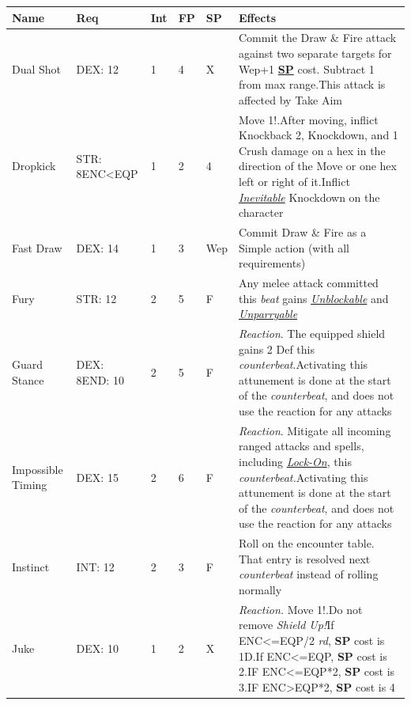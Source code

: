 \documentclass[12pt]{article}
\newcommand{\refto}[1]{\hyperlink{#1}{\textbf{#1}}}
\newcommand{\reftoit}[1]{\hyperlink{#1}{\emph{#1}}}
\begin{document}
\begin{center}
\begin{tabularx}{\textwidth}{p{}p{}p{}p{}p{}p{}}
\hline
\rowcolor{white} \textbf{Name} & \textbf{Req} & \textbf{Int} & \textbf{FP} & \textbf{SP} & \textbf{Effects}\setcounter{rownum}{0}\\
\hline
Dual Shot & DEX: 12 & 1 & 4 & X & Commit the Draw \& Fire attack against two separate targets for Wep+1 \refto{SP} cost. Subtract 1 from max range.\newline This attack is affected by Take Aim\\
Dropkick & STR: 8\newline ENC<EQP & 1 & 2 & 4 & Move 1!.\newline After moving, inflict Knockback 2, Knockdown, and 1 Crush damage on a hex in the direction of the Move or one hex left or right of it.\newline Inflict \reftoit{Inevitable} Knockdown on the character\\
Fast Draw & DEX: 14 & 1 & 3 & Wep & Commit Draw \& Fire as a Simple action (with all requirements)\\
Fury & STR: 12 & 2 & 5 & F & Any melee attack committed this \emph{beat} gains \reftoit{Unblockable} and \reftoit{Unparryable}\\
Guard Stance & DEX: 8\newline END: 10 & 2 & 5 & F & \emph{Reaction}. The equipped shield gains 2 Def this \emph{counterbeat}.\newline Activating this attunement is done at the start of the \emph{counterbeat}, and does not use the reaction for any attacks\\
Impossible Timing & DEX: 15 & 2 & 6 & F & \emph{Reaction}. Mitigate all incoming ranged attacks and spells, including \reftoit{Lock-On}, this \emph{counterbeat.}\newline Activating this attunement is done at the start of the \emph{counterbeat}, and does not use the reaction for any attacks\\
Instinct & INT: 12 & 2 & 3 & F & Roll on the encounter table. That entry is resolved next \emph{counterbeat} instead of rolling normally \\
Juke & DEX: 10 & 1 & 2 & X & \emph{Reaction.} Move 1!.\newline Do not remove \emph{Shield Up!}\newline If ENC<=EQP/2 \emph{rd}, \textbf{SP} cost is 1D.\newline If ENC<=EQP, \textbf{SP} cost is 2.\newline IF ENC<=EQP*2, \textbf{SP} cost is 3.\newline IF ENC>EQP*2, \textbf{SP} cost is 4 \\

\end{tabularx}
\end{center}
\end{document}
